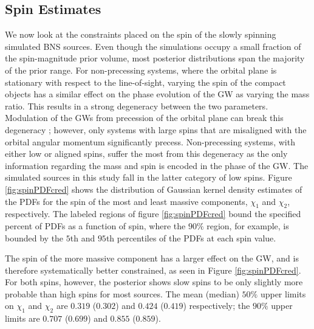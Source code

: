 \subsection{Spin Estimates}\label{sec:spin-magnitudes}
We now look at the constraints placed on the spin of the slowly spinning simulated BNS sources.  Even though the simulations occupy a small fraction of the spin-magnitude prior volume, most posterior distributions span the majority of the prior range. For non-precessing systems, where the orbital plane is stationary with respect to the line-of-sight, varying the spin of the compact objects has a similar effect on the phase evolution of the GW as varying the mass ratio. This results in a strong degeneracy between the two parameters.  Modulation of the GWs from precession of the orbital plane can break this degeneracy \citep{Vecchio_2004,Lang_2006,Vitale_2014,Chatziioannou_2014}; however, only systems with large spins that are misaligned with the orbital angular momentum significantly precess. Non-precessing systems, with either low or aligned spins, suffer the most from this degeneracy as the only information regarding the mass and spin is encoded in the phase of the GW.  The simulated sources in this study fall in the latter category of low spins.  Figure  \ref{fig:spinPDFcred} shows the distribution of Gaussian kernel density estimates of the PDFs for the spin of the most and least massive components, $\chi_1$ and $\chi_2$, respectively.  The labeled regions of figure \ref{fig:spinPDFcred} bound the specified percent of PDFs as a function of spin, where the $90\%$ region, for example, is bounded by the $5$th and $95$th percentiles of the PDFs at each spin value. 

The spin of the more massive component has a larger effect on the GW, and is therefore systematically better constrained, as seen in Figure \ref{fig:spinPDFcred}.  For both spins, however, the posterior shows slow spins to be only slightly more probable than high spins for most sources. The mean (median) $50\%$ upper limits on $\chi_1$ and $\chi_2$ are $0.319$ ($0.302$) and $0.424$ ($0.419$) respectively; the $90\%$ upper limits are $0.707$ ($0.699$) and $0.855$ ($0.859$).
  
  
  
  
  
  
  
  
  
  
  
  